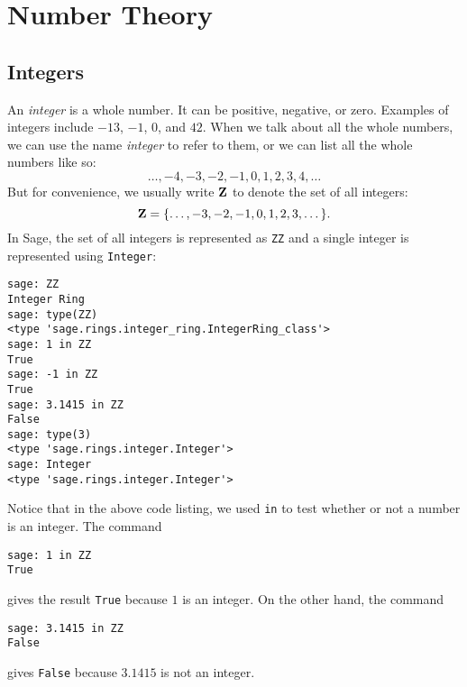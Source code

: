 
\chapter{Number Theory}



\section{Integers}

An \emph{integer} is a whole number. It can be positive, negative, or
zero. Examples of integers include $-13$, $-1$, $0$, and $42$. When we
talk about all the whole numbers, we can use the name \emph{integer}
to refer to them, or we can list all the whole numbers like so:
\[
\dots, -4, -3, -2, -1, 0, 1, 2, 3, 4, \dots
\]
But for convenience, we usually write $\mathbf{Z}$ to denote the set of all
integers:
\[
\mathbf{Z}
=
\{\dots, -3, -2, -1, 0, 1, 2, 3, \dots\}.
\]
In Sage, the set of all integers is represented as \verb!ZZ! and a
single integer is represented using \verb!Integer!:
%
\begin{lstlisting}
sage: ZZ
Integer Ring
sage: type(ZZ)
<type 'sage.rings.integer_ring.IntegerRing_class'>
sage: 1 in ZZ
True
sage: -1 in ZZ
True
sage: 3.1415 in ZZ
False
sage: type(3)
<type 'sage.rings.integer.Integer'>
sage: Integer
<type 'sage.rings.integer.Integer'>
\end{lstlisting}
%
Notice that in the above code listing, we used \verb!in! to test
whether or not a number is an integer. The command
%
\begin{lstlisting}
sage: 1 in ZZ
True
\end{lstlisting}
%
gives the result \verb!True! because $1$ is an integer. On the other
hand, the command
%
\begin{lstlisting}
sage: 3.1415 in ZZ
False
\end{lstlisting}
%
gives \verb!False! because $3.1415$ is not an integer.
